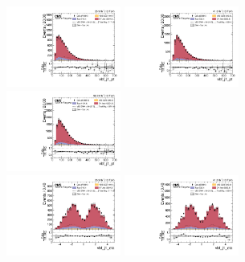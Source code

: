 \begin{figure}[!ht]
  \centering
  \includegraphics[width=0.335\textwidth]{analysis_plots/2016_zjj/cr_vjets_l/vbf_j1_pt.pdf} \hspace{-10pt}
  \includegraphics[width=0.335\textwidth]{analysis_plots/2017_zjj/cr_vjets_l/vbf_j1_pt.pdf} \hspace{-10pt}
  \includegraphics[width=0.335\textwidth]{analysis_plots/2018_zjj/cr_vjets_l/vbf_j1_pt.pdf} \hspace{-10pt} \\
  \includegraphics[width=0.335\textwidth]{analysis_plots/2016_zjj/cr_vjets_l/vbf_j1_eta.pdf} \hspace{-10pt}
  \includegraphics[width=0.335\textwidth]{analysis_plots/2017_zjj/cr_vjets_l/vbf_j1_eta.pdf} \hspace{-10pt}

\end{figure}
